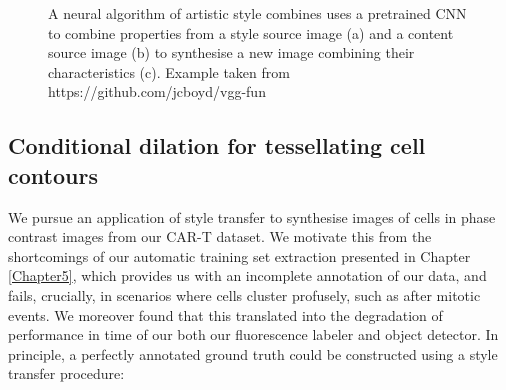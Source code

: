 \begin{figure}%
    \centering
    \qquad
    \qquad
    \caption{A neural algorithm of artistic style combines uses a pretrained CNN to combine properties from a style source image (a) and a content source image (b) to synthesise a new image combining their characteristics (c). Example taken from https://github.com/jcboyd/vgg-fun}%
    \label{fig:style_transfer}%
\end{figure}

\subsection{Conditional dilation for tessellating cell contours}

We pursue an application of style transfer to synthesise images of cells in phase contrast images from our CAR-T dataset. We motivate this from the shortcomings of our automatic training set extraction presented in Chapter \ref{Chapter5}, which provides us with an incomplete annotation of our data, and fails, crucially, in scenarios where cells cluster profusely, such as after mitotic events. We moreover found that this translated into the degradation of performance in time of our both our fluorescence labeler and object detector. In principle, a perfectly annotated ground truth could be constructed using a style transfer procedure:

